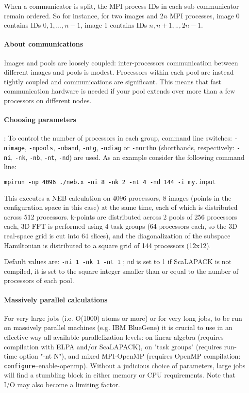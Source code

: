 \documentclass[12pt,a4paper]{article}
\def\configure{\texttt{configure}}
\begin{document}
When a communicator is split, the MPI process IDs in each sub-communicator
remain ordered. So for instance, for two images and $2n$ MPI processes,
image 0 contains IDs $0,1,...,n-1$, image 1 contains IDs $n,n+1,..,2n-1$.

\paragraph{About communications}
Images and pools are loosely coupled: inter-processors communication
between different images and pools is modest. Processors within each
pool are instead tightly coupled and communications are significant.
This means that fast communication hardware is needed if
your pool extends over more than a few processors on different nodes.

\paragraph{Choosing parameters}:
To control the number of processors in each group,
command line switches:
\texttt{-nimage}, \texttt{-npools}, \texttt{-nband},
\texttt{-ntg}, \texttt{-ndiag} or \texttt{-northo}
(shorthands, respectively: \texttt{-ni}, \texttt{-nk}, \texttt{-nb},
\texttt{-nt}, \texttt{-nd})
are used.
As an example consider the following command line:
\begin{verbatim}
mpirun -np 4096 ./neb.x -ni 8 -nk 2 -nt 4 -nd 144 -i my.input
\end{verbatim}
This executes a NEB calculation on 4096 processors, 8 images (points in the configuration
space in this case) at the same time, each of
which is distributed across 512 processors.
k-points are distributed across 2 pools of 256 processors each,
3D FFT is performed using 4 task groups (64 processors each, so
the 3D real-space grid is cut into 64 slices), and the diagonalization
of the subspace Hamiltonian is distributed to a square grid of 144
processors (12x12).

Default values are: \texttt{-ni 1 -nk 1 -nt 1} ;
\texttt{nd} is set to 1 if ScaLAPACK is not compiled,
it is set to the square integer smaller than or equal to the number of
processors of each pool.

\paragraph{Massively parallel calculations}
For very large jobs (i.e. O(1000) atoms or more) or for very long jobs,
to be run on massively parallel  machines (e.g. IBM BlueGene) it is
crucial to use in an effective way all available parallelization levels:
on linear algebra (requires compilation with ELPA and/or ScaLAPACK),
on "task groups" (requires run-time option "-nt N"), and mixed
MPI-OpenMP (requires OpenMP compilation: \configure --enable-openmp).
Without a judicious choice of parameters, large jobs will find a
stumbling block in either memory or CPU requirements. Note that I/O
may also become a limiting factor.
\end{document}
